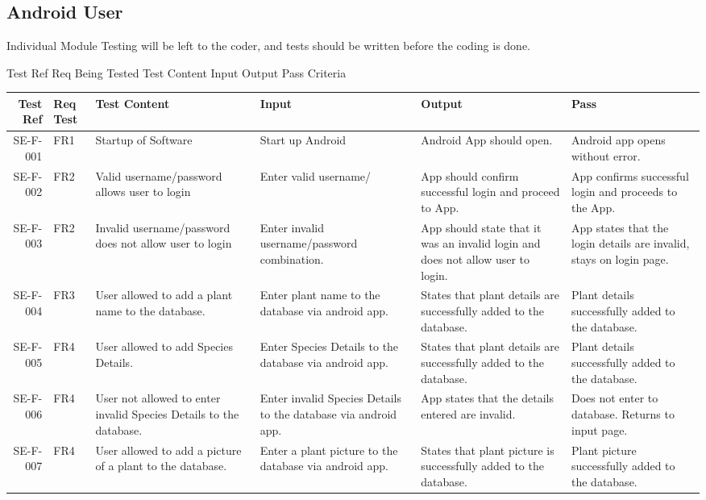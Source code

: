 \subsection{Android User}
	Individual Module Testing will be left to the coder, and tests should be written before the coding is done.

	Test Ref Req Being Tested Test Content Input Output Pass Criteria

	\begin{landscape}
		\begin{longtable}{|r|l|p{4cm}|p{4cm}|p{4cm}|p{4cm}|}
		\hline
		Test Ref & Req Test & Test Content & Input & Output & Pass \\ \hline
		SE-F-001 & FR1 & Startup of Software & Start up Android & Android App should open. & Android app opens without error. \\ \hline
		SE-F-002 & FR2 & Valid username/password allows user to login & Enter valid username/ & App should confirm successful login and proceed to App. & App confirms successful login and proceeds to the App. \\ \hline
		SE-F-003 & FR2 & Invalid username/password does not allow user to login & Enter invalid username/password combination. &  App should state that it was an invalid login and does not allow user to login. & App states that the login details are invalid, stays on login page. \\ \hline
		SE-F-004 & FR3 & User allowed to add a plant name to the database. & Enter plant name to the database via android app. & States that plant details are successfully added to the database. & Plant details successfully added to the database. \\ \hline
		SE-F-005 & FR4 & User allowed to add Species Details. & Enter Species Details to the database via android app. & States that plant details are successfully added to the database. & Plant details successfully added to the database. \\ \hline
		SE-F-006 & FR4 & User not allowed to enter invalid Species Details to the database. & Enter invalid Species Details to the database via android app. & App states that the details entered are invalid. & Does not enter to database. Returns to input page. \\ \hline
		SE-F-007 & FR4 & User allowed to add a picture of a plant to the database. & Enter a plant picture to the database via android app. & States that plant picture is successfully added to the database. & Plant picture successfully added to the database. \\ \hline

\end{longtable}
\end{landscape}
